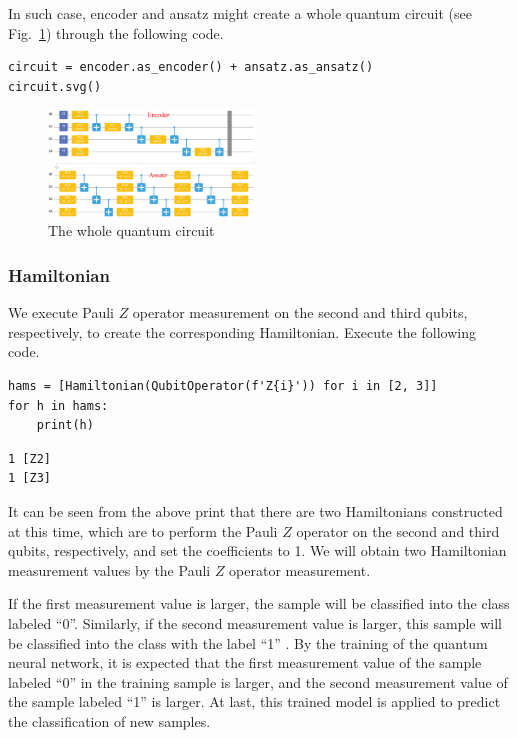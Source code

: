 In such case, encoder and ansatz might create a whole quantum circuit (see Fig.~\ref{5.1total-circuit}) through the following code.

\begin{lstlisting}
circuit = encoder.as_encoder() + ansatz.as_ansatz()                  
circuit.svg()
\end{lstlisting}

\begin{figure}[H]
    \centering
    \includegraphics[width=0.49\textwidth]{5.1_figures/total-circuit.eps}
    \caption{The whole quantum circuit}
    \label{5.1total-circuit}
\end{figure}

\subsubsection{Hamiltonian}
We execute Pauli $Z$ operator measurement on the second and third qubits, respectively, to create the corresponding Hamiltonian. Execute the following code.

\begin{lstlisting}
hams = [Hamiltonian(QubitOperator(f'Z{i}')) for i in [2, 3]] 
for h in hams:
    print(h)
\end{lstlisting}

\begin{lstlisting}
1 [Z2]
1 [Z3]
\end{lstlisting}

It can be seen from the above print that there are two Hamiltonians constructed at this time, which are to perform the Pauli $Z$ operator on the second and third qubits, respectively, and set the coefficients to 1. We will obtain two Hamiltonian measurement values by the Pauli $Z$ operator measurement.

If the first measurement value is larger, the sample will be classified into the class labeled ``0''.  Similarly, if the second measurement value is larger, this sample will be classified into the class with the label ``1'' . By the training of the quantum neural network, it is expected that the first measurement value of the sample labeled ``0''  in the training sample is larger, and the second measurement value of the sample labeled ``1'' is larger. At last, this trained model is applied to predict the classification of new samples.

